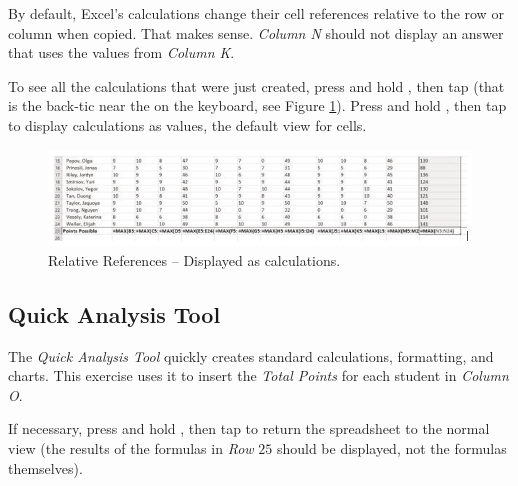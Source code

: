 By default, Excel's calculations change their cell references relative to the row or column when copied. That makes sense. \textit{Column N} should not display an answer that uses the values from \textit{Column K}.

To see all the calculations that were just created, press and hold , then tap  (that is the back-tic near the  on the keyboard, see Figure \ref{03:fig03}). Press and hold , then tap  to display calculations as values, the default view for cells.

\begin{figure}[H]
	\centering
	\includegraphics[width=\maxwidth{.95\linewidth}]{gfx/ch03_fig03}
	\caption{Relative References – Displayed as calculations.}
	\label{03:fig03}
\end{figure}

\subsection{Quick Analysis Tool}

The \textit{Quick Analysis Tool} quickly creates standard calculations, formatting, and charts. This exercise uses it to insert the \textit{Total Points} for each student in \textit{Column O}.

If necessary, press and hold , then tap  to return the spreadsheet to the normal view (the results of the formulas in \textit{Row }$ 25 $ should be displayed, not the formulas themselves).

